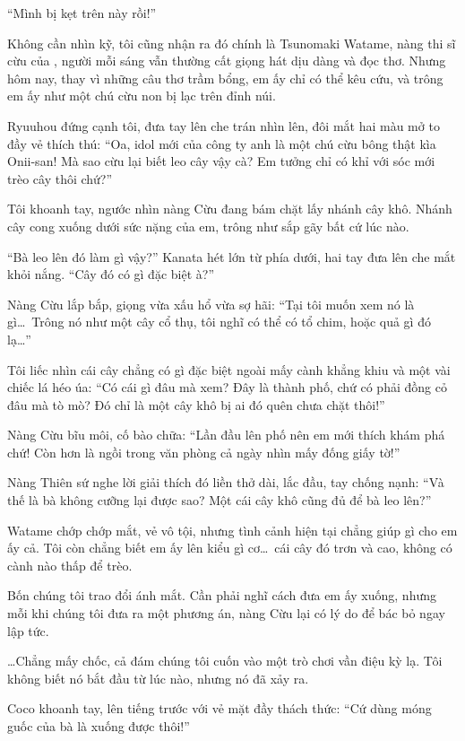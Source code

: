 \documentclass[../main.tex]{subfiles}
\begin{document}
``Mình bị kẹt trên này rồi!''


Không cần nhìn kỹ, tôi cũng nhận ra đó chính là Tsunomaki Watame, nàng thi sĩ cừu của \hll, người mỗi sáng vẫn thường cất giọng hát dịu dàng và đọc thơ. Nhưng hôm nay, thay vì những câu thơ trầm bổng, em ấy chỉ có thể kêu cứu, và trông em ấy như một chú cừu non bị lạc trên đỉnh núi.

Ryuuhou đứng cạnh tôi, đưa tay lên che trán nhìn lên, đôi mắt hai màu mở to đầy vẻ thích thú: ``Oa, idol mới của công ty anh là một chú cừu bông thật kìa Onii-san! Mà sao cừu lại biết leo cây vậy cà? Em tưởng chỉ có khỉ với sóc mới trèo cây thôi chứ?''

Tôi khoanh tay, ngước nhìn nàng Cừu đang bám chặt lấy nhánh cây khô. Nhánh cây cong xuống dưới sức nặng của em, trông như sắp gãy bất cứ lúc nào.

``Bà leo lên đó làm gì vậy?'' Kanata hét lớn từ phía dưới, hai tay đưa lên che mắt khỏi nắng. ``Cây đó có gì đặc biệt à?''

Nàng Cừu lắp bắp, giọng vừa xấu hổ vừa sợ hãi: ``Tại tôi muốn xem nó là gì\dots\ Trông nó như một cây cổ thụ, tôi nghĩ có thể có tổ chim, hoặc quả gì đó lạ\dots''

Tôi liếc nhìn cái cây chẳng có gì đặc biệt ngoài mấy cành khẳng khiu và một vài chiếc lá héo úa: ``Có cái gì đâu mà xem? Đây là thành phố, chứ có phải đồng cỏ đâu mà tò mò? Đó chỉ là một cây khô bị ai đó quên chưa chặt thôi!''

Nàng Cừu bĩu môi, cố bào chữa: ``Lần đầu lên phố nên em mới thích khám phá chứ! Còn hơn là ngồi trong văn phòng cả ngày nhìn mấy đống giấy tờ!''

Nàng Thiên sứ nghe lời giải thích đó liền thở dài, lắc đầu, tay chống nạnh: ``Và thế là bà không cưỡng lại được sao? Một cái cây khô cũng đủ để bà leo lên?''

Watame chớp chớp mắt, vẻ vô tội, nhưng tình cảnh hiện tại chẳng giúp gì cho em ấy cả. Tôi còn chẳng biết em ấy lên kiểu gì cơ\dots\ cái cây đó trơn và cao, không có cành nào thấp để trèo.

Bốn chúng tôi trao đổi ánh mắt. Cần phải nghĩ cách đưa em ấy xuống, nhưng mỗi khi chúng tôi đưa ra một phương án, nàng Cừu lại có lý do để bác bỏ ngay lập tức.

\dots Chẳng mấy chốc, cả đám chúng tôi cuốn vào một trò chơi vần điệu kỳ lạ. Tôi không biết nó bắt đầu từ lúc nào, nhưng nó đã xảy ra.

Coco khoanh tay, lên tiếng trước với vẻ mặt đầy thách thức: ``Cứ dùng móng guốc của bà là xuống được thôi!''
\end{document}
